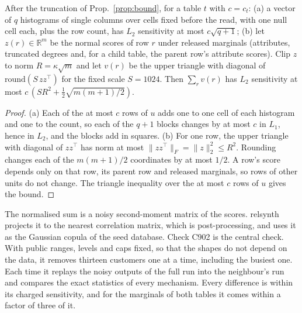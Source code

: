\setcounter{proposition}{901}
\begin{proposition}\label{prop:sens}
After the truncation of Prop.~\ref{prop:bound}, for a table $t$ with $c=c_t$:
(a) a vector of $q$ histograms of single columns over cells fixed before the read, with one null cell each, plus the row count, has $L_2$ sensitivity at most $c\sqrt{q+1}$;
(b) let $z(r)\in\mathbb{R}^m$ be the normal scores of row $r$ under released marginals (attributes, truncated degrees and, for a child table, the parent row's attribute scores). Clip $z$ to norm $R=\kappa\sqrt m$ and let $v(r)$ be the upper triangle with diagonal of $\mathrm{round}(S\,zz^\top)$ for the fixed scale $S=1024$. Then $\sum_r v(r)$ has $L_2$ sensitivity at most $c\,(SR^2+\tfrac12\sqrt{m(m+1)/2})$.
\end{proposition}
\begin{proof}
(a) Each of the at most $c$ rows of $u$ adds one to one cell of each histogram and one to the count, so each of the $q+1$ blocks changes by at most $c$ in $L_1$, hence in $L_2$, and the blocks add in squares. (b) For one row, the upper triangle with diagonal of $zz^\top$ has norm at most $\|zz^\top\|_F=\|z\|_2^2\le R^2$. Rounding changes each of the $m(m+1)/2$ coordinates by at most $1/2$. A row's score depends only on that row, its parent row and released marginals, so rows of other units do not change. The triangle inequality over the at most $c$ rows of $u$ gives the bound.
\end{proof}
\noindent The normalised sum is a noisy second-moment matrix of the scores. relsynth projects it to the nearest correlation matrix, which is post-processing, and uses it as the Gaussian copula of the seed database. Check C902 is the central check. With public ranges, levels and caps fixed, so that the shapes do not depend on the data, it removes thirteen customers one at a time, including the busiest one. Each time it replays the noisy outputs of the full run into the neighbour's run and compares the exact statistics of every mechanism. Every difference is within its charged sensitivity, and for the marginals of both tables it comes within a factor of three of it.

